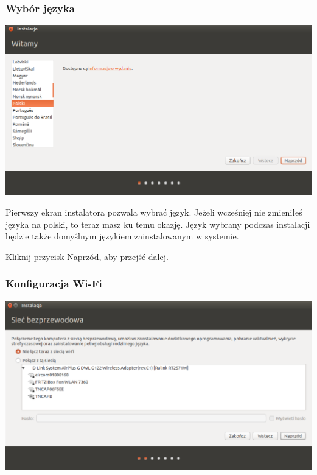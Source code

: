 \subsubsection{Wybór języka}
\begin{center}
        \includegraphics[width=\linewidth]{images/instalator_jezyk.png}
\end{center}

Pierwszy ekran instalatora pozwala wybrać język. Jeżeli wcześniej nie zmieniłeś języka na polski, to teraz masz ku temu okazję. Język wybrany podczas instalacji będzie także domyślnym językiem zainstalowanym w systemie.
\begin{flushright}
Kliknij przycisk \textcolor{ubuntu_orange}{Naprzód}, aby przejść dalej.
\end{flushright}
\clearpage
\subsubsection{Konfiguracja Wi-Fi}
\begin{center}
        \includegraphics[width=\linewidth]{images/instalator_wifi.png}
\end{center}

